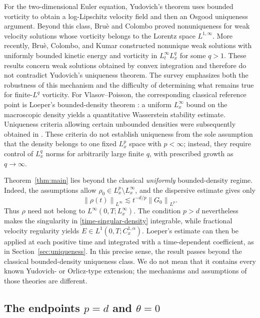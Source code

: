 \documentclass[11pt]{article}
\newcommand{\norm}[1]{\left\lVert #1\right\rVert}
\begin{document}
For the two-dimensional Euler equation, Yudovich's theorem uses bounded
vorticity to obtain a log-Lipschitz velocity field and then an Osgood
uniqueness argument.  Beyond this class, Bru\`e and
Colombo \cite{BrueColombo} proved nonuniqueness for weak velocity solutions
whose vorticity belongs to the Lorentz space $L^{1,\infty}$.  More recently,
Bru\`e, Colombo, and Kumar \cite{BrueColomboKumar} constructed nonunique weak
solutions with uniformly bounded kinetic energy and vorticity in
$L^\infty_tL^q_x$ for some $q>1$.  These results concern weak solutions
obtained by convex integration and therefore do not contradict Yudovich's
uniqueness theorem.   The survey \cite{Brue} emphasizes both the robustness
of this mechanism and the difficulty of determining what remains true for
finite-$L^q$ vorticity.  For Vlasov--Poisson, the corresponding classical
reference point is Loeper's bounded-density theorem \cite{Loeper}: a uniform
$L^\infty_x$ bound on the macroscopic density yields a quantitative
Wasserstein stability estimate.  Uniqueness criteria allowing certain
unbounded densities were subsequently obtained in \cite{Uniqueness,Yudovich}.
These criteria do not establish uniqueness from the sole
assumption that the density belongs to one fixed $L^p_x$ space with
$p<\infty$; instead, they require control of $L^q_x$ norms for arbitrarily
large finite $q$, with prescribed growth as $q\to\infty$.

Theorem~\ref{thm:main} lies beyond the classical \emph{uniformly}
bounded-density regime.  Indeed, the assumptions allow
$\rho_0\in L^p_x\setminus L^\infty_x$, and the dispersive estimate gives only
 \begin{equation}\label{time-singular-density}
 \norm{\rho(t)}_{L^\infty}\lesssim t^{-d/p}\norm{G_0}_{L^p}.
\end{equation} 
Thus $\rho$ need not belong to $L^\infty(0,T;L^\infty_x)$.  The condition
$p>d$ nevertheless makes the singularity in
\eqref{time-singular-density} integrable, while fractional velocity
regularity yields $E\in L^1(0,T;C^{1,\alpha}_x)$.  Loeper's estimate can then
be applied at each positive time and integrated with a time-dependent
coefficient, as in Section~\ref{sec:uniqueness}.  In this precise sense, the
result passes beyond the classical bounded-density uniqueness class.  We do
not mean that it contains every known Yudovich- or Orlicz-type extension;
the mechanisms and assumptions of those theories are different.

\subsection{The endpoints \texorpdfstring{$p=d$ and $\theta=0$}{p equal to d and theta equal to zero}}
\end{document}
